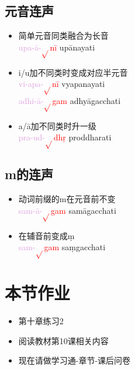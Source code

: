 \documentclass[17pt]{beamer}
\newcommand{\verbroot}[1]{\textcolor{red}{$\sqrt{}$#1}}
\newcommand{\fullpada}[1]{\textcolor{OliveGreen}{#1}}
\newcommand{\pratyaya}[1]{\textcolor{Plum}{#1}}
\begin{document}
\subsection{元音连声}

\begin{frame}{\insertsubsection }
  \begin{itemize}
    \item 简单元音同类融合为长音\\
    \pratyaya{upa\nobreakdash-ā\nobreakdash-}\verbroot{nī} \fullpada{upānayati}  \\
    \item i/u加不同类时变成对应半元音\\
    \pratyaya{vi\nobreakdash-apa\nobreakdash-}\verbroot{nī} \fullpada{vyapanayati}  \\
    \pratyaya{adhi\nobreakdash-ā\nobreakdash-}\verbroot{gam} \fullpada{adhyāgacchati}  \\
    \item a/ā加不同类时升一级\\ 
    \pratyaya{pra\nobreakdash-ud\nobreakdash-}\verbroot{dhṛ} \fullpada{proddharati}  \\
  \end{itemize}
\end{frame}

\subsection{m的连声}

\begin{frame}{\insertsubsection }
  \begin{itemize}
    \item 动词前缀的m在元音前不变\\
    \pratyaya{sam\nobreakdash-ā\nobreakdash-}\verbroot{gam} \fullpada{samāgacchati}  \\
    \item 在辅音前变成ṃ\\
    \pratyaya{sam\nobreakdash-}\verbroot{gam} \fullpada{saṃgacchati}  \\
  \end{itemize}
\end{frame}

\section{本节作业}

\begin{frame}{\insertsection }
  \begin{itemize}
    \item
      第十章练习2
    \item
      阅读教材第10课相关内容
    \bigskip
    \item
      现在请做学习通\nobreakdash-章节\nobreakdash-课后问卷
  \end{itemize}
\end{frame}  
\end{document}
